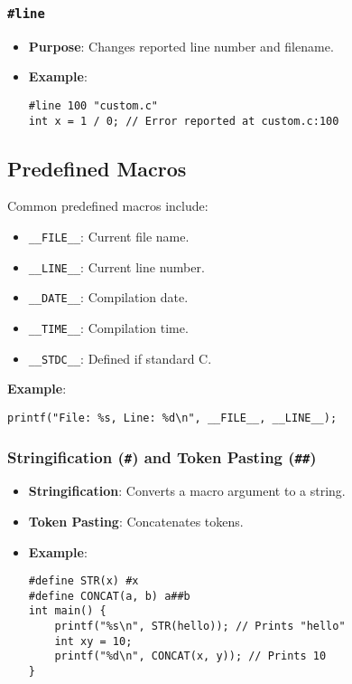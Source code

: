 \documentclass[a4paper,12pt]{article}
\begin{document}
\subsubsection{\texttt{\#line}}
\begin{itemize}[noitemsep]
    \item \textbf{Purpose}: Changes reported line number and filename.
    \item \textbf{Example}:
    
\begin{lstlisting}[caption=\#line directive]
#line 100 "custom.c"
int x = 1 / 0; // Error reported at custom.c:100
\end{lstlisting}
    
\end{itemize}

\subsection{Predefined Macros}
Common predefined macros include:
\begin{itemize}[noitemsep]
    \item \texttt{\_\_FILE\_\_}: Current file name.
    \item \texttt{\_\_LINE\_\_}: Current line number.
    \item \texttt{\_\_DATE\_\_}: Compilation date.
    \item \texttt{\_\_TIME\_\_}: Compilation time.
    \item \texttt{\_\_STDC\_\_}: Defined if standard C.
\end{itemize}
\textbf{Example}:

\begin{lstlisting}[caption=Predefined Macros example]
printf("File: %s, Line: %d\n", __FILE__, __LINE__);
\end{lstlisting}

\subsubsection*{Stringification (\texttt{\#}) and Token Pasting (\texttt{\#\#})}
\begin{itemize}[noitemsep]
    \item \textbf{Stringification}: Converts a macro argument to a string.
    \item \textbf{Token Pasting}: Concatenates tokens.
    \item \textbf{Example}:

\begin{lstlisting}[caption=Macro argument to string conversion]
#define STR(x) #x
#define CONCAT(a, b) a##b
int main() {
    printf("%s\n", STR(hello)); // Prints "hello"
    int xy = 10;
    printf("%d\n", CONCAT(x, y)); // Prints 10
}
\end{lstlisting}

\end{itemize}
\end{document}
